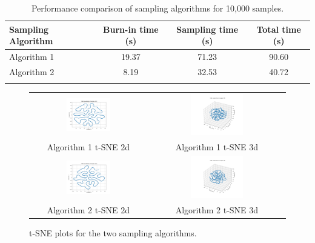 \documentclass[11pt]{article}
\begin{document}
\begin{longtable}{|l|c|c|c|}
    \hline
    \textbf{Sampling Algorithm} & \textbf{Burn-in time (s)} & \textbf{Sampling time (s)} & \textbf{Total time (s)} \\
    \hline
    Algorithm 1 & 19.37 & 71.23 & 90.60 \\
    \hline
    Algorithm 2 & 8.19 & 32.53 & 40.72 \\
    \hline
    \caption{Performance comparison of sampling algorithms for 10,000 samples.}
\end{longtable}

\begin{figure}[H]
    \centering
    \begin{tabular}{cc}
        \includegraphics[width=0.4\textwidth]{../TASK-0-1/tsne_plot_sklearn_2d_1.png} &
        \includegraphics[width=0.4\textwidth]{../TASK-0-1/tsne_plot_sklearn_3d_1.png} \\
        Algorithm 1 t-SNE 2d & Algorithm 1 t-SNE 3d \\[0.5em]
        
        \includegraphics[width=0.4\textwidth]{../TASK-0-1/tsne_plot_sklearn_2d_2.png} &
        \includegraphics[width=0.4\textwidth]{../TASK-0-1/tsne_plot_sklearn_3d_2.png} \\
        Algorithm 2 t-SNE 2d & Algorithm 2 t-SNE 3d \\
    \end{tabular}
    \caption{t-SNE plots for the two sampling algorithms.}
    \label{fig:tsne}
\end{figure}
\end{document}
